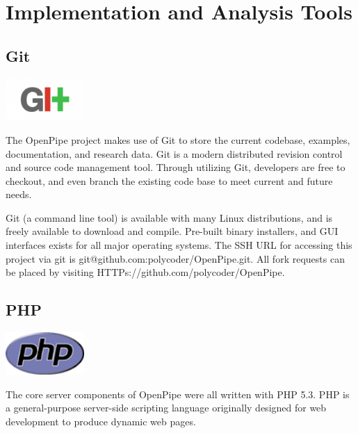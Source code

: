 \documentclass[12pt]{report}
\begin{document}

\chapter{Implementation and Analysis Tools}

\section{Git}
\begin{center} 
\includegraphics[width=30mm]{figures/images/git_logo.png}
\end{center}

The OpenPipe project makes use of Git to store the current codebase, examples, documentation, and research data. Git is a modern distributed revision control and source code management tool. Through utilizing Git, developers are free to checkout, and even branch the existing code base to meet current and future needs.

Git (a command line tool) is available with many Linux distributions, and is freely available to download and compile. Pre-built binary installers, and GUI interfaces exists for all major operating systems.  The SSH URL for accessing this project via git is git@github.com:polycoder/OpenPipe.git. All fork requests can be placed by visiting HTTPs://github.com/polycoder/OpenPipe.

\section{PHP}
\begin{center} 
\includegraphics[width=30mm]{figures/images/php_logo.png}
\end{center}

The core server components of OpenPipe were all written with PHP 5.3. PHP is a general-purpose server-side scripting language originally designed for web development to produce dynamic web pages.
\end{document}
